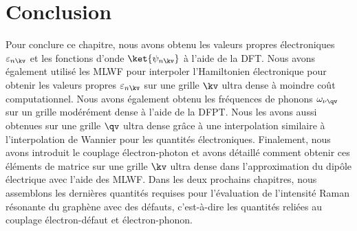 \section{Conclusion}
Pour conclure ce chapitre, nous avons obtenu les valeurs propres électroniques $\varepsilon_{n\kv}$ et les fonctions d'onde $\ket{\psi_{n\kv}}$ à l'aide de la DFT. Nous avons également utilisé les MLWF pour interpoler l'Hamiltonien électronique pour obtenir les valeurs propres $\varepsilon_{n\kv}$ sur une grille $\kv$ ultra dense à moindre coût computationnel. Nous avons également obtenu les fréquences de phonons $\omega_{\nu\qv}$ sur un grille modérément dense à l'aide de la DFPT. Nous les avons aussi obtenues sur une grille $\qv$ ultra dense grâce à une interpolation similaire à l'interpolation de Wannier pour les quantités électroniques. Finalement, nous avons introduit le couplage électron-photon et avons détaillé comment obtenir ces éléments de matrice sur une grille $\kv$ ultra dense dans l'approximation du dipôle électrique avec l'aide des MLWF. Dans les deux prochains chapitres, nous assemblons les dernières quantités requises pour l'évaluation de l'intensité Raman résonante du graphène avec des défauts, c'est-à-dire les quantités reliées au couplage électron-défaut et électron-phonon. 